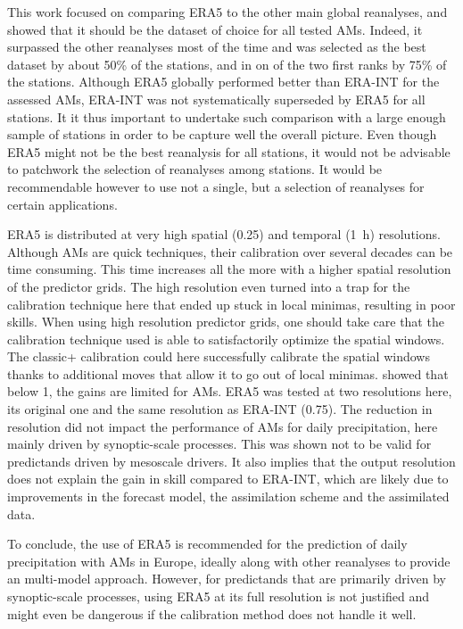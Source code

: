 \documentclass[alpha-refs]{wiley-article}
\begin{document}
This work focused on comparing ERA5 to the other main global reanalyses, and showed that it should be the dataset of choice for all tested AMs. Indeed, it surpassed the other reanalyses most of the time and was selected as the best dataset by about 50\% of the stations, and in on of the two first ranks by 75\% of the stations. Although ERA5 globally performed better than ERA-INT for the assessed AMs, ERA-INT was not systematically superseded by ERA5 for all stations. It it thus important to undertake such comparison with a large enough sample of stations in order to be capture well the overall picture. Even though ERA5 might not be the best reanalysis for all stations, it would not be advisable to patchwork the selection of reanalyses among stations. It would be recommendable however to use not a single, but a selection of reanalyses for certain applications.

ERA5 is distributed at very high spatial (0.25\degree) and temporal (1~h) resolutions. Although AMs are quick techniques, their calibration over several decades can be time consuming. This time increases all the more with a higher spatial resolution of the predictor grids. The high resolution even turned into a trap for the calibration technique here that ended up stuck in local minimas, resulting in poor skills. When using high resolution predictor grids, one should take care that the calibration technique used is able to satisfactorily optimize the spatial windows. The classic+ calibration \citep{Horton2019} could here successfully calibrate the spatial windows thanks to additional moves that allow it to go out of local minimas. \citet{Horton2018b} showed that below 1\degree, the gains are limited for AMs. ERA5 was tested at two resolutions here, its original one and the same resolution as ERA-INT (0.75\degree). The reduction in resolution did not impact the performance of AMs for daily precipitation, here mainly driven by synoptic-scale processes. This was shown not to be valid for predictands driven by mesoscale drivers. It also implies that the output resolution does not explain the gain in skill compared to ERA-INT, which are likely due to improvements in the forecast model, the assimilation scheme and the assimilated data.

To conclude, the use of ERA5 is recommended for the prediction of daily precipitation with AMs in Europe, ideally along with other reanalyses to provide an multi-model approach. However, for predictands that are primarily driven by synoptic-scale processes, using ERA5 at its full resolution is not justified and might even be dangerous if the calibration method does not handle it well.
\end{document}
